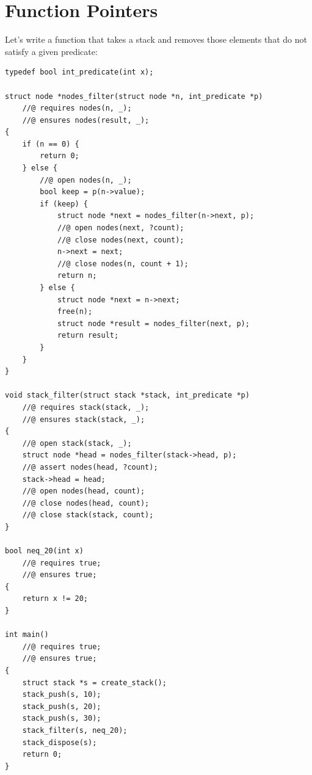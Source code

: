 \documentclass{article}
\begin{document}
\section{Function Pointers}\label{section:function-pointers}

Let's write a function that takes a stack and removes those elements that do not satisfy a given predicate:
\begin{lstlisting}
typedef bool int_predicate(int x);

struct node *nodes_filter(struct node *n, int_predicate *p)
    //@ requires nodes(n, _);
    //@ ensures nodes(result, _);
{
    if (n == 0) {
        return 0;
    } else {
        //@ open nodes(n, _);
        bool keep = p(n->value);
        if (keep) {
            struct node *next = nodes_filter(n->next, p);
            //@ open nodes(next, ?count);
            //@ close nodes(next, count);
            n->next = next;
            //@ close nodes(n, count + 1);
            return n;
        } else {
            struct node *next = n->next;
            free(n);
            struct node *result = nodes_filter(next, p);
            return result;
        }
    }
}

void stack_filter(struct stack *stack, int_predicate *p)
    //@ requires stack(stack, _);
    //@ ensures stack(stack, _);
{
    //@ open stack(stack, _);
    struct node *head = nodes_filter(stack->head, p);
    //@ assert nodes(head, ?count);
    stack->head = head;
    //@ open nodes(head, count);
    //@ close nodes(head, count);
    //@ close stack(stack, count);
}

bool neq_20(int x)
    //@ requires true;
    //@ ensures true;
{
    return x != 20;
}

int main()
    //@ requires true;
    //@ ensures true;
{
    struct stack *s = create_stack();
    stack_push(s, 10);
    stack_push(s, 20);
    stack_push(s, 30);
    stack_filter(s, neq_20);
    stack_dispose(s);
    return 0;
}
\end{lstlisting}
\end{document}
